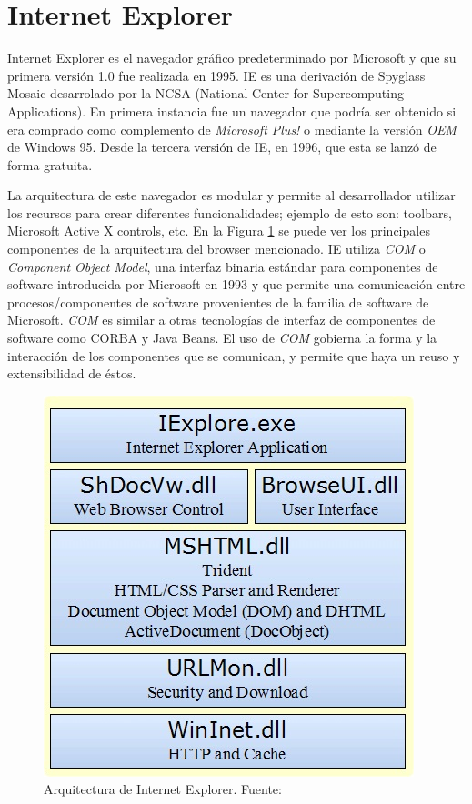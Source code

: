 
\section{Internet Explorer}
    \label{chap3:IE}
    Internet Explorer es el navegador gráfico predeterminado por Microsoft y que su primera versión 1.0 fue realizada en 1995. IE es una derivación de Spyglass Mosaic desarrolado por la NCSA (National Center for Supercomputing Applications). En primera instancia fue un navegador que podría ser obtenido si era comprado como complemento de \textit{Microsoft Plus!} o mediante la versión \textit{OEM} de Windows 95. Desde la tercera versión de IE, en 1996, que esta se lanzó de forma gratuita.
            
    La arquitectura de este navegador es modular y permite al desarrollador utilizar los recursos para crear diferentes funcionalidades; ejemplo de esto son: toolbars, Microsoft Active X controls, etc. En la Figura \ref{fig:archIE} \cite{IEArch} se puede ver los principales componentes de la arquitectura del browser mencionado. IE utiliza \textit{COM} o \textit{Component Object Model}, una interfaz binaria estándar para componentes de software introducida por Microsoft en 1993 y que permite una comunicación entre procesos/componentes de software provenientes de la familia de software de Microsoft. \textit{COM} es similar a otras tecnologías de interfaz de componentes de software como CORBA y Java Beans. El uso de \textit{COM} gobierna la forma y la interacción de los componentes que se comunican, y permite que haya un reuso y extensibilidad de éstos.
            
	\begin{figure}[h!t]
	    \centering
		\includegraphics[scale=0.65]{figures/IEArch.jpg}
		\caption{Arquitectura de Internet Explorer. Fuente: \cite{IEArchImg}}
		\label{fig:archIE}
    \end{figure}

